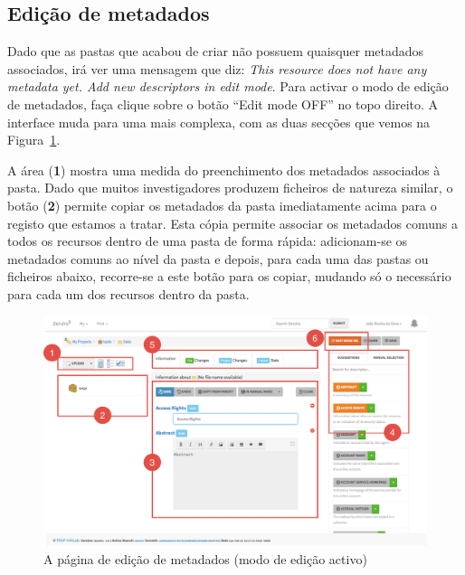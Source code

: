 \documentclass[paper=a4, fontsize=11pt]{scrartcl} %
\numberwithin{equation}{section} %
\numberwithin{figure}{section} %
\numberwithin{table}{section} %
\begin{document}

\subsection{Edição de metadados} %
\label{sub:editing_metadata}

Dado que as pastas que acabou de criar não possuem quaisquer metadados associados, irá ver uma mensagem que diz: \emph{This resource does not have any metadata yet. Add new descriptors in edit mode}. Para activar o modo de edição de metadados, faça clique sobre o botão ``Edit mode OFF'' no topo direito. A interface  muda para uma mais complexa, com as duas secções que vemos na Figura~\ref{fig:dendro_in_edit_mode}.

A área (\textbf{1}) mostra uma medida do preenchimento dos metadados associados à pasta. Dado que muitos investigadores produzem ficheiros de natureza similar, o botão (\textbf{2}) permite copiar os metadados da pasta imediatamente acima para o registo que estamos a tratar. Esta cópia permite associar os metadados comuns a todos os recursos dentro de uma pasta de forma  rápida: adicionam-se os metadados comuns ao nível da pasta e depois, para cada uma das pastas ou ficheiros abaixo, recorre-se a este botão para os copiar, mudando só o necessário para cada um dos recursos dentro da pasta.

\begin{figure}[h!t!]
	\centering
	\includegraphics[width=\textwidth]{Images/in_edit_mode}	
	\caption{A página de edição de metadados (modo de edição activo)}
	\label{fig:dendro_in_edit_mode}
\end{figure}


\end{document}
